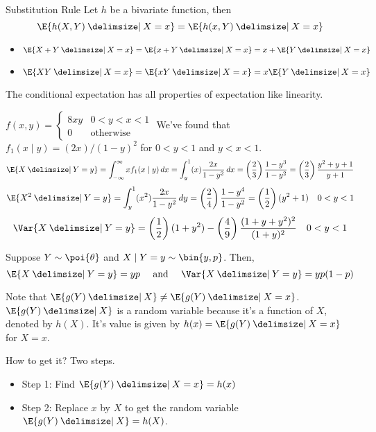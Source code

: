 \begin{Theorem}{Substitution Rule}{}
    Let $ h $ be a bivariate function, then
    \[ \E{h(X,Y)\given X=x}=\E{h(x,Y)\given X=x} \]
\end{Theorem}
\begin{Example}{}{}
    \begin{itemize}
        \item $ \E{X+Y\given X=x}=\E{x+Y\given X=x}=x+\E{Y\given X=x} $
        \item $ \E{XY\given X=x}=\E{xY\given X=x}=x\E{Y\given X=x} $
    \end{itemize}
\end{Example}
\begin{Theorem}{}{}
    The conditional expectation has all properties of expectation like
    linearity.
\end{Theorem}
\begin{Example}{}{}
    $ \displaystyle f(x,y)=\begin{cases}
            8 x y & 0<y<x<1          \\
            0     & \text{otherwise}
        \end{cases} $
    We've found that $ f_1(x\mid y)=(2x)/(1-y)^2 $ for $ 0<y<1 $ and $ y<x<1 $.
    \[ \E{X\given Y=y}=\int_{-\infty}^{\infty} x f_1(x\mid y)\, d{x}=
        \int_{y}^{1} (x) \frac{2x}{1-y^2}\, d{x}=\left( \frac{2}{3} \right)
        \frac{1-y^3}{1-y^2}=\left( \frac{2}{3}  \right)
        \frac{y^2+y+1}{y+1}   \]
    \[ \E{X^2\given Y=y}=\int_{y}^{1} (x^2)
        \frac{2x}{1-y^2} \, d{y}=\left( \frac{2}{4} \right)
        \frac{1-y^4}{1-y^2}=\left( \frac{1}{2}  \right)(y^2+1)\quad 0<y<1 \]
    \[ \Var{X\given Y=y}=\left( \frac{1}{2} \right) (1+y^2)-
        \left( \frac{4}{9}  \right)\frac{(1+y+y^2)^2}{(1+y)^2}\quad 0<y<1  \]
\end{Example}
\begin{Example}{}{}
    Suppose $ Y \sim \poi{\theta} $ and $ X\mid Y=y \sim \bin{y,p} $. Then,
    \[ \E{X\given Y=y}=yp\quad\text{ and }\quad\Var{X\given Y=y}=yp(1-p) \]
\end{Example}
\begin{Remark}{}{}
    Note that $ \E{g(Y)\given X}\neq \E{g(Y)\given X=x} $.
    $ \E{g(Y)\given X} $ is a random variable because it's a function
    of $ X $, denoted by $ h(X) $. It's value is given by $ h(x)=
        \E{g(Y)\given X=x} $ for $ X=x $.

    How to get it? Two steps.
    \begin{itemize}
        \item Step 1: Find $ \E{g(Y)\given X=x}=h(x) $
        \item Step 2: Replace $ x $ by $ X $ to get the random variable $ \E{g(Y)\given X}=h(X) $.
    \end{itemize}
\end{Remark}
